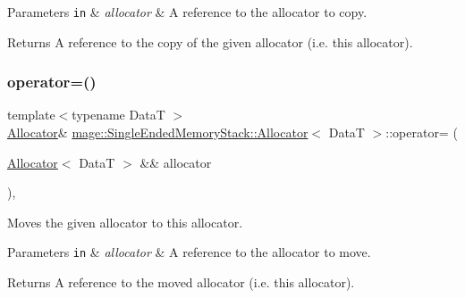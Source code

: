 \begin{DoxyParams}[1]{Parameters}
\mbox{\tt in}  & {\em allocator} & A reference to the allocator to copy. \\
\hline
\end{DoxyParams}
\begin{DoxyReturn}{Returns}
A reference to the copy of the given allocator (i.\+e. this allocator). 
\end{DoxyReturn}
\hypertarget{classmage_1_1_single_ended_memory_stack_1_1_allocator_a43cdcfdfe7ee8d8f82f542245c6fc1d5}{}\label{classmage_1_1_single_ended_memory_stack_1_1_allocator_a43cdcfdfe7ee8d8f82f542245c6fc1d5} 
\subsubsection{\texorpdfstring{operator=()}{operator=()}\hspace{0.1cm}{\footnotesize\ttfamily [2/2]}}
{\footnotesize\ttfamily template$<$typename DataT $>$ \\
\hyperlink{classmage_1_1_single_ended_memory_stack_1_1_allocator}{Allocator}\& \hyperlink{classmage_1_1_single_ended_memory_stack_1_1_allocator}{mage\+::\+Single\+Ended\+Memory\+Stack\+::\+Allocator}$<$ DataT $>$\+::operator= (\begin{DoxyParamCaption}\item[{\hyperlink{classmage_1_1_single_ended_memory_stack_1_1_allocator}{Allocator}$<$ DataT $>$ \&\&}]{allocator }\end{DoxyParamCaption})\hspace{0.3cm}{\ttfamily [default]}, {\ttfamily [noexcept]}}

Moves the given allocator to this allocator.


\begin{DoxyParams}[1]{Parameters}
\mbox{\tt in}  & {\em allocator} & A reference to the allocator to move. \\
\hline
\end{DoxyParams}
\begin{DoxyReturn}{Returns}
A reference to the moved allocator (i.\+e. this allocator). 
\end{DoxyReturn}
\hypertarget{classmage_1_1_single_ended_memory_stack_1_1_allocator_a47f5e7baf66ddebc8aec402c6a9f1eef}{}\label{classmage_1_1_single_ended_memory_stack_1_1_allocator_a47f5e7baf66ddebc8aec402c6a9f1eef} 
